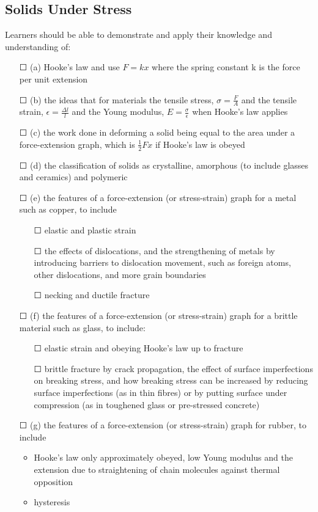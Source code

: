 \subsection{Solids Under Stress}Learners should be able to demonstrate and apply their knowledge and
understanding of:
\begin{itemize}
	\item[\Large{$\Square$}] (a) Hooke’s law and use \(F=kx\) where the spring constant k is the force per unit
	extension
	\item[\Large{$\Square$}]	(b) the ideas that for materials the tensile stress, \sq \(\sigma=\frac{F}{A}\) and the tensile strain, \sq \(\epsilon= \frac{\Delta l}{l}  \)
	and the Young modulus, \sq \(E=\frac{\sigma}{\epsilon}  \) when Hooke’s law applies
	\item[\Large{$\Square$}]		(c) the work done in deforming a solid being equal to the area under a force-extension graph, which is \(\frac{1}{2} Fx\) if Hooke’s law is obeyed
	\item[\Large{$\Square$}]		(d) the classification of solids as \sq crystalline, \sq amorphous (to include glasses and ceramics) and \sq polymeric
	\item[\Large{$\Square$}]	(e) the features of a force-extension (or stress-strain) graph for a metal such as	copper, to include
	\begin{itemize}
		\item[\Large{$\Square$}] elastic and \sq plastic strain
		\item[\Large{$\Square$}] the effects of dislocations, and the strengthening of metals by introducing barriers to dislocation movement, such as foreign atoms, other dislocations, and more grain boundaries
		\item[\Large{$\Square$}] necking and ductile fracture
	\end{itemize}
	\item[\Large{$\Square$}](f) the features of a force-extension (or stress-strain) graph for a brittle material such as glass, to include:
	\begin{itemize}
		\item[\Large{$\Square$}] elastic strain and obeying Hooke’s law up to fracture
		\item[\Large{$\Square$}] brittle fracture by crack propagation, the effect of surface imperfections on breaking stress, and \sq how breaking stress can be increased by reducing surface imperfections (as in thin fibres) or by \sq putting surface under compression (as in toughened glass or pre-stressed	concrete)
	\end{itemize}
	\item[\Large{$\Square$}](g) the features of a force-extension (or stress-strain) graph for rubber, to include
	\begin{itemize}
		\item Hooke’s law only approximately obeyed, low Young modulus and the \sq extension due to straightening of chain molecules against thermal opposition
		\item hysteresis
	\end{itemize}	

\end{itemize}
